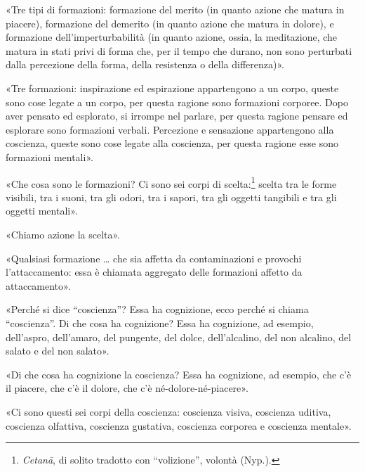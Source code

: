 

«Tre tipi di formazioni: formazione del merito (in quanto azione che
matura in piacere), formazione del demerito (in quanto azione che matura
in dolore), e formazione dell’imperturbabilità (in quanto azione, ossia,
la meditazione, che matura in stati privi di forma che, per il tempo che
durano, non sono perturbati dalla percezione della forma, della
resistenza o della differenza)».




«Tre formazioni: inspirazione ed espirazione appartengono a un corpo,
queste sono cose legate a un corpo, per questa ragione sono formazioni
corporee. Dopo aver pensato ed esplorato, si irrompe nel parlare, per
questa ragione pensare ed esplorare sono formazioni verbali. Percezione
e sensazione appartengono alla coscienza, queste sono cose legate alla
coscienza, per questa ragione esse sono formazioni mentali».




«Che cosa sono le formazioni? Ci sono sei corpi di
scelta:\footnote{\emph{Cetanā}, di solito tradotto con “volizione”, volontà (Nyp.).} scelta tra le forme visibili, tra i suoni, tra
gli odori, tra i sapori, tra gli oggetti tangibili e tra gli oggetti
mentali».




«Chiamo azione la scelta».




«Qualsiasi formazione … che sia affetta da contaminazioni e provochi
l’attaccamento: essa è chiamata aggregato delle formazioni affetto da
attaccamento».




«Perché si dice “coscienza”? Essa ha cognizione, ecco perché si chiama
“coscienza”. Di che cosa ha cognizione? Essa ha cognizione, ad esempio,
dell’aspro, dell’amaro, del pungente, del dolce, dell’alcalino, del non
alcalino, del salato e del non salato».




«Di che cosa ha cognizione la coscienza? Essa ha cognizione, ad esempio,
che c’è il piacere, che c’è il dolore, che c’è né-dolore-né-piacere».




«Ci sono questi sei corpi della coscienza: coscienza visiva, coscienza
uditiva, coscienza olfattiva, coscienza gustativa, coscienza corporea e
coscienza mentale».


